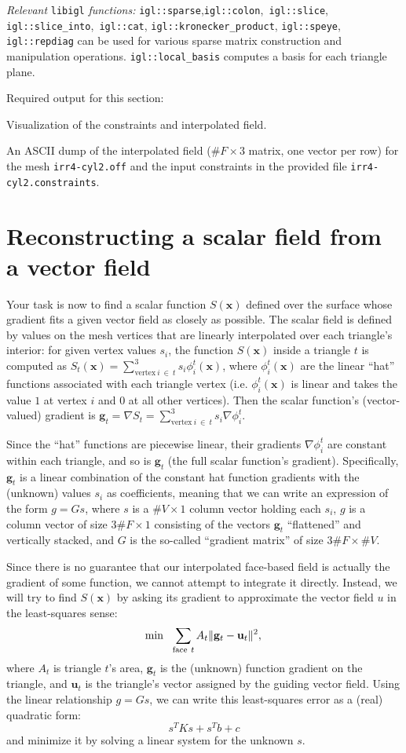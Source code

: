 \documentclass[11pt]{amsart}
\renewcommand{\vec}[1]{\mathbf{#1}}
\newcommand{\bdm}[1]{{\begin{displaymath}#1\end{displaymath}}}
\newcommand{\itemz}[1]{{\begin{itemize}{#1}\end{itemize}}}
\renewcommand{\vec}[1]{\mathbf{#1}}
\def\x{\vec{x}}
\begin{document}
\emph{Relevant} \texttt{libigl} \emph{functions: }
\texttt{igl::sparse},\texttt{igl::colon},\texttt{ igl::slice},\texttt{
    igl::slice\_into},\texttt{ igl::cat}, \texttt{igl::kronecker\_product},
\texttt{igl::speye}, \texttt{igl::repdiag} can be used for various sparse matrix
construction and manipulation operations. \texttt{igl::local\_basis} computes
a basis for each triangle plane.

Required output for this section:
\itemz{
\item{Visualization of the constraints and interpolated field.}
\item{An ASCII dump of the interpolated field ($\#F \times 3$ matrix, one
    vector per row) for the mesh \texttt{irr4-cyl2.off} and the input
    constraints in the provided file \texttt{irr4-cyl2.constraints}.}
}

\section{Reconstructing a scalar field from a vector field}
Your task is now to find a scalar function $S(\x)$ defined over the surface
whose gradient fits a given vector field as closely as possible.
The scalar field is defined by values on the mesh vertices that are
linearly interpolated over each triangle's interior: for given vertex values
$s_i$, the function $S(\x)$ inside a triangle $t$ is computed as $S_t(\x) =
\sum\limits_{\textrm{vertex}~i~\in~t}^3 s_i \phi_i^t(\x)$, where $\phi_i^t(\x)$ are the
linear ``hat'' functions associated with each triangle vertex (i.e. $\phi_i^t(\x)$
is linear and takes the value $1$ at vertex $i$ and $0$ at all other vertices).
Then the scalar function's (vector-valued) gradient is $\vec g_t = \nabla
S_t = \sum\limits_{\textrm{vertex}~i~\in~t}^3 s_i \nabla\phi_i^t$. 

Since the ``hat'' functions are piecewise linear, their  gradients
$\nabla\phi_i^t$ are constant within each triangle, and so is $\vec g_t$ (the
full scalar function's gradient). Specifically, $\vec g_t$ is a
linear combination of the constant hat function gradients with the (unknown)
values $s_i$ as coefficients, meaning that we can write an expression of the
form $g  = G s$, where $s$ is a $\#V\times 1$ column vector holding each
$s_i$, $g$ is a column vector of size $3\#F\times 1$
consisting of the vectors $\vec g_t$ ``flattened'' and vertically stacked, and
$G$ is the so-called ``gradient matrix'' of size $3\#F\times \#V$.

Since there is no guarantee that our interpolated face-based field is actually
the gradient of some function, we cannot attempt to integrate it directly.
Instead, we will try to find $S(\x)$ by asking its gradient to approximate the
vector field $u$ in the least-squares sense:
\bdm{
\min ~~\sum\limits_{\textrm{face}~t} A_t \|\vec g_t-\vec u_t\|^2,\\
}
where $A_t$ is triangle $t$'s area, $\vec g_t$ is the (unknown) function
gradient on the triangle, and $\vec u_t$ is the triangle's vector assigned by
the guiding vector field. Using the linear relationship $g = Gs$, we can write
this least-squares error as a (real) quadratic form:
$$s^TKs + s^Tb + c$$
and minimize it by solving a linear system for the unknown $s$.
\end{document}
